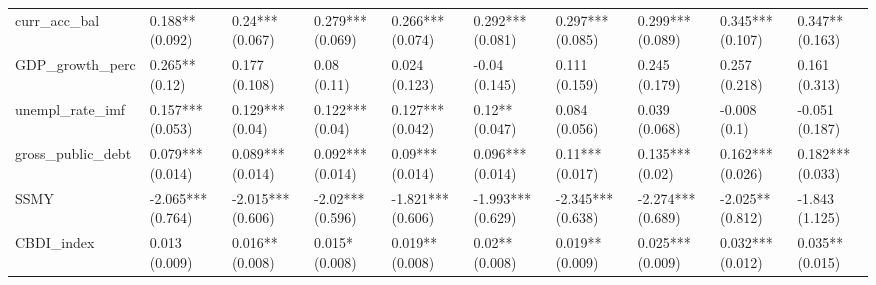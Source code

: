 \begin{table}[ht]
\begin{tabular}{llllllllll}
  curr\_acc\_bal & 0.188** (0.092) & 0.24*** (0.067) & 0.279*** (0.069) & 0.266*** (0.074) & 0.292*** (0.081) & 0.297*** (0.085) & 0.299*** (0.089) & 0.345*** (0.107) & 0.347** (0.163) \\ 
  GDP\_growth\_perc & 0.265** (0.12) & 0.177 (0.108) & 0.08 (0.11) & 0.024 (0.123) & -0.04 (0.145) & 0.111 (0.159) & 0.245 (0.179) & 0.257 (0.218) & 0.161 (0.313) \\ 
  unempl\_rate\_imf & 0.157*** (0.053) & 0.129*** (0.04) & 0.122*** (0.04) & 0.127*** (0.042) & 0.12** (0.047) & 0.084 (0.056) & 0.039 (0.068) & -0.008 (0.1) & -0.051 (0.187) \\ 
  gross\_public\_debt & 0.079*** (0.014) & 0.089*** (0.014) & 0.092*** (0.014) & 0.09*** (0.014) & 0.096*** (0.014) & 0.11*** (0.017) & 0.135*** (0.02) & 0.162*** (0.026) & 0.182*** (0.033) \\ 
  SSMY & -2.065*** (0.764) & -2.015*** (0.606) & -2.02*** (0.596) & -1.821*** (0.606) & -1.993*** (0.629) & -2.345*** (0.638) & -2.274*** (0.689) & -2.025** (0.812) & -1.843 (1.125) \\ 
  CBDI\_index & 0.013 (0.009) & 0.016** (0.008) & 0.015* (0.008) & 0.019** (0.008) & 0.02** (0.008) & 0.019** (0.009) & 0.025*** (0.009) & 0.032*** (0.012) & 0.035** (0.015) \\ 
   \bottomrule
\end{tabular}
\endgroup
\end{table}
